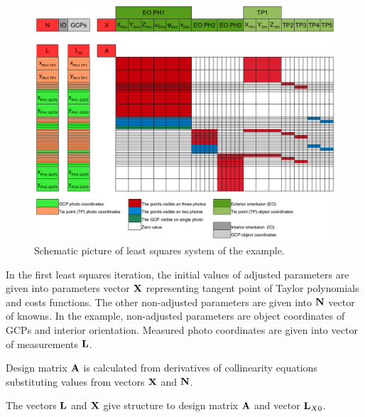 \documentclass[a4paper,12pt]{article}
\newcommand{\evect}[1]{%
{\bf #1}%
}
\begin{document}
\begin{figure}[!h]
   \includegraphics[scale=0.47,  angle=90]{figures/bba_system.png}
    \caption{Schematic picture of least squares system of the example.}
    \label{fig:bba_system}
\end{figure}



In the first least squares iteration, the initial values of adjusted parameters are given into parameters vector $\evect{X}$
 representing tangent point of Taylor polynomials and costs functions.  The other non-adjusted 
parameters are given into $\evect{N}$ vector of knowns. In the example, non-adjusted parameters are object coordinates
of GCPs and interior orientation. 
Measured photo coordinates are given
into vector of measurements $\evect{L}$.

Design matrix $\evect{A}$ is calculated from 
derivatives of collinearity equations substituting values from vectors $\evect{X}$ and $\evect{N}$.


The vectors  $\evect{L}$ and  $\evect{X}$ give structure to design matrix $\evect{A}$ and
vector $\evect{L}_{X0}$.
\end{document}
